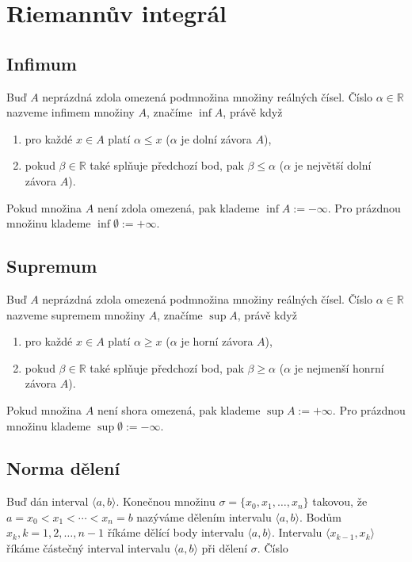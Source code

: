 \documentclass{szzclass}
\begin{document}
\section{Riemannův integrál}
\subsection{Infimum}
Buď $A$ neprázdná zdola omezená podmnožina množiny reálných čísel.
Číslo $\alpha\in\mathbb{R}$ nazveme infimem množiny $A$, značíme
$\inf A$, právě když
\begin{enumerate}
    \item pro každé $x\in A$ platí $\alpha\leq x$ ($\alpha$ je dolní závora $A$),
    \item pokud $\beta\in \mathbb{R}$ také splňuje předchozí bod, pak $\beta\leq\alpha$ ($\alpha$ je největší dolní závora $A$).
\end{enumerate}

Pokud množina $A$ není zdola omezená, pak klademe $\inf A:=-\infty$. Pro prázdnou množinu klademe $\inf \emptyset:=+\infty$.


\subsection{Supremum}
Buď $A$ neprázdná zdola omezená podmnožina množiny reálných čísel.
Číslo $\alpha\in\mathbb{R}$ nazveme supremem množiny $A$, značíme
$\sup A$, právě když
\begin{enumerate}
    \item pro každé $x\in A$ platí $\alpha\geq x$ ($\alpha$ je horní závora $A$),
    \item pokud $\beta\in \mathbb{R}$ také splňuje předchozí bod,
    pak $\beta\geq\alpha$ ($\alpha$ je nejmenší honrní závora $A$).
\end{enumerate}

Pokud množina $A$ není shora omezená, pak klademe $\sup A:=+\infty$.
Pro prázdnou množinu klademe $\sup \emptyset:=-\infty$.

\newpage

\subsection{Norma dělení}
Buď dán interval $\langle a,b \rangle$. Konečnou množinu
$\sigma = \{x_0,x_1,\ldots,x_n\}$
takovou, že
$a = x_0 < x_1 < \cdots < x_n = b$
nazýváme dělením intervalu $\langle a,b \rangle$. Bodům $x_k, k=1,2,\ldots,n-1$
říkáme dělící body intervalu $\langle a,b \rangle$. Intervalu
$\langle x_{k−1},x_k \rangle$ říkáme částečný interval intervalu
$\langle a,b \rangle$ při dělení $\sigma$. Číslo
\end{document}
